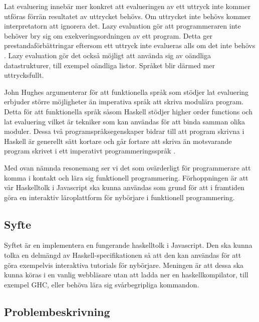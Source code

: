 Lat evaluering innebär mer konkret att evalueringen av ett uttryck inte kommer utföras förrän resultatet av uttrycket behövs. Om uttrycket inte behövs  kommer interpretatorn att ignorera det. 
Lazy evaluation gör att programmeraren inte behöver bry sig om exekveringsordningen av ett program. Detta ger prestandaförbättringar eftersom ett uttryck inte evalueras alls om det inte behövs \citep{hudak89}.
Lazy evaluation gör det också möjligt att använda sig av oändliga datastrukturer, till exempel oändliga listor. Språket blir därmed mer uttrycksfullt. 

John Hughes argumenterar för att  funktionella språk som stödjer lat evaluering erbjuder större möjligheter än imperativa språk att skriva modulära program. Detta för att funktionella språk såsom Haskell stödjer higher order functions och lat evaluering vilket är tekniker som kan användas för att binda samman olika moduler.
Dessa två programspråksegenskaper bidrar till att program skrivna i Haskell är generellt sätt kortare och går fortare att skriva än motsvarande program skrivet i ett imperativt programmeringsspråk  \citep{why}.

Med ovan nämnda resonemang ser vi det som ovärderligt för programmerare att komma i kontakt och lära sig funktionell programmering. 
Förhoppningen är att vår Haskelltolk i Javascript ska kunna användas som grund för att i framtiden göra en interaktiv läroplattform för nybörjare i funktionell programmering. 


\subsection{Syfte}
Syftet är en implementera en fungerande haskelltolk i Javascript. Den ska kunna tolka en delmängd av Haskell-specifikationen så att den kan användas för att göra exempelvis interaktiva tutorials för nybörjare.
Meningen är att dessa ska kunna köras i en vanlig webbläsare utan att ladda ner en haskellkompilator, till exempel GHC, eller behöva lära sig svårbegripliga kommandon.

\subsection{Problembeskrivning} 

